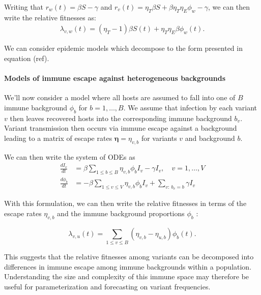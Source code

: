 \documentclass[12pt,oneside,letterpaper]{article}
\renewcommand{\vec}[1]{\boldsymbol{#1}}
\begin{document}
Writing that $r_{w}(t) = \beta S - \gamma$ and $r_{v}(t) = \eta_{T} \beta  S + \beta \eta_{T} \eta_{E} \phi_{w} - \gamma$, we can then write the relative fitnesses as:
\begin{align*}
\lambda_{v,w}(t) = (\eta_{T} - 1)\beta S(t) + \eta_{T} \eta_{E} \beta \phi_{w}(t).
\end{align*}


We can consider epidemic models which decompose to the form presented in equation (ref).


\paragraph{Models of immune escape against heterogeneous backgrounds}%

We'll now consider a model where all hosts are assumed to fall into one of $B$ immune background $\phi_{b}$ for $b =1, \ldots, B$.
We assume that infection by each variant $v$ then leaves recovered hosts into the corresponding immune background $b_{v}$.
Variant transmission then occurs via immune escape against a background leading to a matrix of escape rates $\vec{\eta} = \eta_{v,b}$ for variants $v$ and background $b$.

We can then write the system of ODEs as 
\begin{align*}
    \frac{d I_{v}}{dt} &= \beta \sum_{1\leq b \leq B} \eta_{v, b} \phi_{b} I_{v} - \gamma I_{v}, \quad v = 1, \ldots, V\\
    \frac{d \phi_{b}}{dt} &= - \beta \sum_{1\leq v \leq V} \eta_{v,b}\phi_{b} I_{v} +  \sum_{v:\ b_{v} = b} \gamma I_{v}
\end{align*}

With this formulation, we can then write the relative fitnesses in terms of the escape rates $\eta_{v,b}$ and the immune background proportions $\phi_{b}$ :

\begin{equation} \label{eq:escape_relative_fitness}
    \lambda_{v, u}(t) = \sum_{1\leq v \leq B}(\eta_{v,b} - \eta_{u,b}) \phi_{b}(t).
\end{equation}

This suggests that the relative fitnesses among variants can be decomposed into differences in immune escape among immune backgrounds within a population.
Understanding the size and complexity of this immune space may therefore be useful for parameterization and forecasting on variant frequencies.
\end{document}
